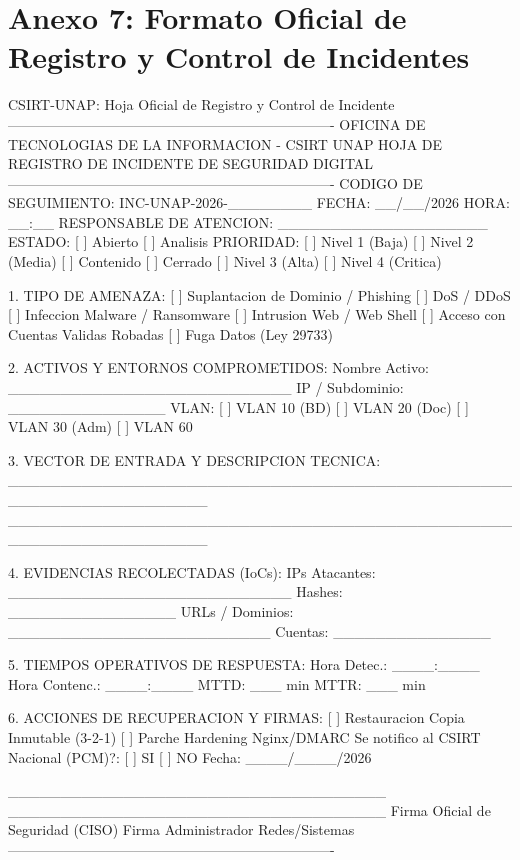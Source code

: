 \section*{Anexo 7: Formato Oficial de Registro y Control de Incidentes}

\begin{cmdbox}{CSIRT-UNAP: Hoja Oficial de Registro y Control de Incidente}
----------------------------------------------------------------------
     OFICINA DE TECNOLOGIAS DE LA INFORMACION - CSIRT UNAP
         HOJA DE REGISTRO DE INCIDENTE DE SEGURIDAD DIGITAL
----------------------------------------------------------------------
CODIGO DE SEGUIMIENTO: INC-UNAP-2026-________  FECHA: __/__/2026  HORA: __:__
RESPONSABLE DE ATENCION: ____________________  ESTADO: [ ] Abierto [ ] Analisis
PRIORIDAD: [ ] Nivel 1 (Baja)   [ ] Nivel 2 (Media)    [ ] Contenido [ ] Cerrado
           [ ] Nivel 3 (Alta)   [ ] Nivel 4 (Critica)

1. TIPO DE AMENAZA:
   [ ] Suplantacion de Dominio / Phishing        [ ] DoS / DDoS
   [ ] Infeccion Malware / Ransomware            [ ] Intrusion Web / Web Shell
   [ ] Acceso con Cuentas Validas Robadas        [ ] Fuga Datos (Ley 29733)

2. ACTIVOS Y ENTORNOS COMPROMETIDOS:
   Nombre Activo: ___________________________ IP / Subdominio: _______________
   VLAN: [ ] VLAN 10 (BD)  [ ] VLAN 20 (Doc)  [ ] VLAN 30 (Adm)  [ ] VLAN 60

3. VECTOR DE ENTRADA Y DESCRIPCION TECNICA:
   ___________________________________________________________________
   ___________________________________________________________________

4. EVIDENCIAS RECOLECTADAS (IoCs):
   IPs Atacantes: ___________________________ Hashes: ________________
   URLs / Dominios: _________________________ Cuentas: _______________

5. TIEMPOS OPERATIVOS DE RESPUESTA:
   Hora Detec.: ____:____  Hora Contenc.: ____:____  MTTD: ___ min  MTTR: ___ min

6. ACCIONES DE RECUPERACION Y FIRMAS:
   [ ] Restauracion Copia Inmutable (3-2-1)   [ ] Parche Hardening Nginx/DMARC
   Se notifico al CSIRT Nacional (PCM)?: [ ] SI  [ ] NO   Fecha: ____/____/2026

   ____________________________________   ____________________________________
   Firma Oficial de Seguridad (CISO)      Firma Administrador Redes/Sistemas
----------------------------------------------------------------------
\end{cmdbox}

